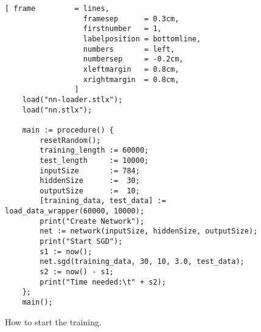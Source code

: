 \begin{figure}[!ht]
\centering
\begin{Verbatim}[ frame         = lines, 
                  framesep      = 0.3cm, 
                  firstnumber   = 1,
                  labelposition = bottomline,
                  numbers       = left,
                  numbersep     = -0.2cm,
                  xleftmargin   = 0.8cm,
                  xrightmargin  = 0.8cm,
                ]
    load("nn-loader.stlx");
    load("nn.stlx");
    
    main := procedure() {
        resetRandom();
        training_length := 60000;
        test_length     := 10000;
        inputSize       := 784;
        hiddenSize      :=  30;
        outputSize      :=  10;
        [training_data, test_data] := load_data_wrapper(60000, 10000);
        print("Create Network");
        net := network(inputSize, hiddenSize, outputSize);
        print("Start SGD");
        s1 := now();
        net.sgd(training_data, 30, 10, 3.0, test_data);
        s2 := now() - s1;
        print("Time needed:\t" + s2);
    };
    main();
\end{Verbatim}
\vspace*{-0.3cm}
\caption{How to start the training.}
\label{fig:nn-start.stlx}
\end{figure}


